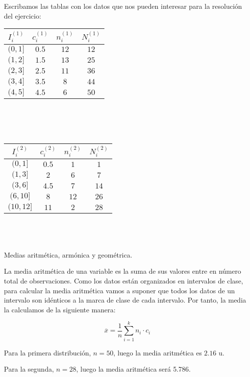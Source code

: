 Escribamos las tablas con los datos que nos pueden interesar para la resolución del ejercicio: \\

\begin{tabular}{| c | c | c | c |}
	\hline
	$I_i^{(1)}$ & $c_i^{(1)}$ & $n_i^{(1)}$ & $N_i^{(1)}$ \\ \hline
	$(0, 1]$ & $0.5$ & $12$ & $12$ \\
	$(1, 2]$ & $1.5$ & $13$ & $25$ \\
	$(2, 3]$ & $2.5$ & $11$ & $36$ \\
	$(3, 4]$ & $3.5$ & $8$ & $44$ \\
	$(4, 5]$ & $4.5$ & $6$ & $50$ \\ \hline
	
\end{tabular} \\\\\\

\begin{tabular}{| c | c | c | c |}
	\hline
	$I_i^{(2)}$ & $c_i^{(2)}$ & $n_i^{(2)}$ & $N_i^{(2)}$ \\ \hline
	$(0, 1]$ & $0.5$ & $1$ & $1$ \\
	$(1, 3]$ & $2$ & $6$ & $7$ \\
	$(3, 6]$ & $4.5$ & $7$ & $14$ \\
	$(6, 10]$ & $8$ & $12$ & $26$ \\
	$(10, 12]$ & $11$ & $2$ & $28$ \\ \hline
	
\end{tabular}\\
\\ 
\\
\subproblem
Medias aritm{\'e}tica, arm{\'o}nica y geom{\'e}trica.

La media aritmética de una variable es la suma de sus valores entre en número total de observaciones. Como los datos están organizados en intervalos de clase, para calcular la media aritmética vamos a suponer que todos los datos de un intervalo son idénticos a la marca de clase de cada intervalo. Por tanto, la media la calculamos de la siguiente manera: 
	
	$$\overline{x} = \dfrac{1}{n}\sum_{i=1}^{k}n_i·c_i$$


Para la primera distribución, $n = 50$, luego la media aritmética es $2.16$ u. 

Para la segunda, $n = 28$, luego la media aritmética será 5.786. \\


